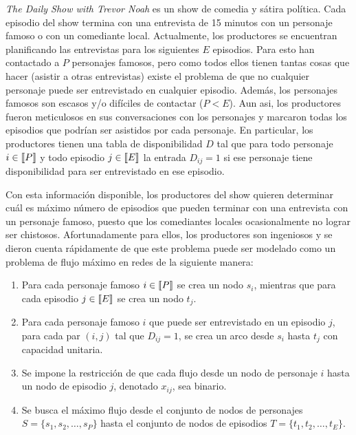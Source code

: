 \documentclass[ a4paper, twoside, 11pt]{article}
\begin{document}
\begin{problem}
\emph{The Daily Show with Trevor Noah} es un show de comedia y s\'atira pol\'itica. Cada episodio del show termina con una entrevista de 15 minutos con un personaje famoso o con un comediante local. Actualmente, los productores se encuentran planificando las entrevistas para los siguientes $E$ episodios. Para esto han contactado a $P$ personajes famosos, pero como todos ellos tienen tantas cosas que hacer (\eg asistir a otras entrevistas) existe el problema de que no cualquier personaje puede ser entrevistado en cualquier episodio. Adem\'as, los personajes famosos son escasos y/o dif\'iciles de contactar (\ie $P < E$). Aun asi, los productores fueron meticulosos en sus conversaciones con los personajes y marcaron todas los episodios que podr\'ian ser asistidos por cada personaje. En particular, los productores tienen una tabla de disponibilidad $D$ tal que para todo personaje $i \in \llbracket P \rrbracket$ y todo episodio $j \in \llbracket E \rrbracket$ la entrada $D_{ij} = 1$ si ese personaje tiene disponibilidad para ser entrevistado en ese episodio. 

Con esta informaci\'on disponible, los productores del show quieren determinar cu\'al es m\'aximo n\'umero de episodios que pueden terminar con una entrevista con un personaje famoso, puesto que los comediantes locales ocasionalmente no lograr ser chistosos. Afortunadamente para ellos, los productores son ingeniosos y se dieron cuenta r\'apidamente de que este problema puede ser modelado como un problema de flujo m\'aximo en redes de la siguiente manera: 
\begin{enumerate}
\item Para cada personaje famoso $i \in \llbracket P \rrbracket$ se crea un nodo $s_i$, mientras que para cada episodio $j \in \llbracket E \rrbracket$ se crea un nodo $t_j$. 
\item Para cada personaje famoso $i$ que puede ser entrevistado en un episodio $j$, \ie para cada par $(i,j)$ tal que $D_{ij} = 1$, se crea un arco desde $s_i$ hasta $t_j$ con capacidad unitaria. 
\item Se impone la restricci\'on de que cada flujo desde un nodo de personaje $i$ hasta un nodo de episodio $j$, denotado $x_{ij}$, sea binario. 
\item Se busca el m\'aximo flujo desde el conjunto de nodos de personajes $S = \{ s_1, s_2, \dots, s_P \}$ hasta el conjunto de nodos de episodios $T = \{ t_1, t_2, \dots, t_E \}$. 
\end{enumerate}


\end{problem}
\end{document}
